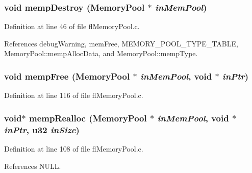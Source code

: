 \subsubsection{\setlength{\rightskip}{0pt plus 5cm}void memp\-Destroy ({\bf Memory\-Pool} $\ast$ {\em in\-Mem\-Pool})}\label{flMemoryPool_8c_4ea44cdbe9ed23b758d649449c75b8db}




Definition at line 46 of file fl\-Memory\-Pool.c.

References debug\-Warning, mem\-Free, MEMORY\_\-POOL\_\-TYPE\_\-TABLE, Memory\-Pool::memp\-Alloc\-Data, and Memory\-Pool::memp\-Type.
\subsubsection{\setlength{\rightskip}{0pt plus 5cm}void memp\-Free ({\bf Memory\-Pool} $\ast$ {\em in\-Mem\-Pool}, void $\ast$ {\em in\-Ptr})}\label{flMemoryPool_8c_a5168ffae3d62c3014e3365c997ca944}




Definition at line 116 of file fl\-Memory\-Pool.c.
\subsubsection{\setlength{\rightskip}{0pt plus 5cm}void$\ast$ memp\-Realloc ({\bf Memory\-Pool} $\ast$ {\em in\-Mem\-Pool}, void $\ast$ {\em in\-Ptr}, u32 {\em in\-Size})}\label{flMemoryPool_8c_4bf21cb48cb26dfcdd48fb0dca0ce4a0}




Definition at line 108 of file fl\-Memory\-Pool.c.

References NULL.